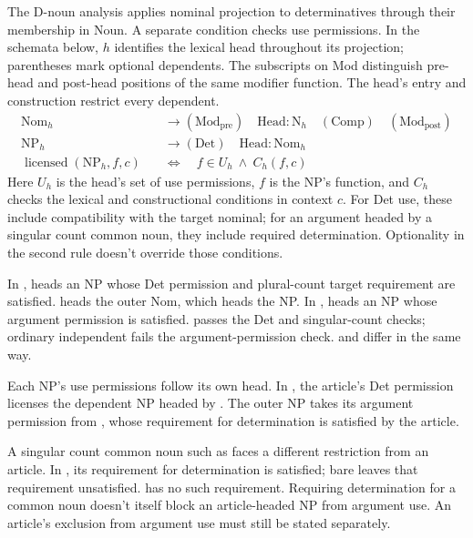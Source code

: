 \documentclass[12pt]{article}
\begin{document}
The D-noun analysis applies nominal projection to determinatives through their membership in Noun. A separate condition checks use permissions. In the schemata below, $h$ identifies the lexical head throughout its projection; parentheses mark optional dependents. The subscripts on Mod distinguish pre-head and post-head positions of the same modifier function. The head's entry and construction restrict every dependent.
\[
\begin{aligned}
\mathrm{Nom}_{h} &\to (\mathrm{Mod}_{\mathrm{pre}})\quad \mathrm{Head}:\mathrm{N}_{h}\quad (\mathrm{Comp})\quad (\mathrm{Mod}_{\mathrm{post}}) \\
\mathrm{NP}_{h} &\to (\mathrm{Det})\quad \mathrm{Head}:\mathrm{Nom}_{h} \\
\operatorname{licensed}(\mathrm{NP}_{h},f,c)\quad &\Longleftrightarrow\quad f\in U_h\ \land\ C_h(f,c)
\end{aligned}
\]
Here $U_h$ is the head's set of use permissions, $f$ is the NP's function, and $C_h$ checks the lexical and constructional conditions in context $c$. For Det use, these include compatibility with the target nominal; for an argument headed by a singular count common noun, they include required determination. Optionality in the second rule doesn't override those conditions.

In ,  heads an NP whose Det permission and plural-count target requirement are satisfied.  heads the outer Nom, which heads the NP. In ,  heads an NP whose argument permission is satisfied.  passes the Det and singular-count checks; ordinary independent  fails the argument-permission check.  and  differ in the same way.

Each NP's use permissions follow its own head. In , the article's Det permission licenses the dependent NP headed by . The outer NP takes its argument permission from , whose requirement for determination is satisfied by the article.

A singular count common noun such as  faces a different restriction from an article. In , its requirement for determination is satisfied; bare  leaves that requirement unsatisfied.  has no such requirement. Requiring determination for a common noun doesn't itself block an article-headed NP from argument use. An article's exclusion from argument use must still be stated separately.
\end{document}
